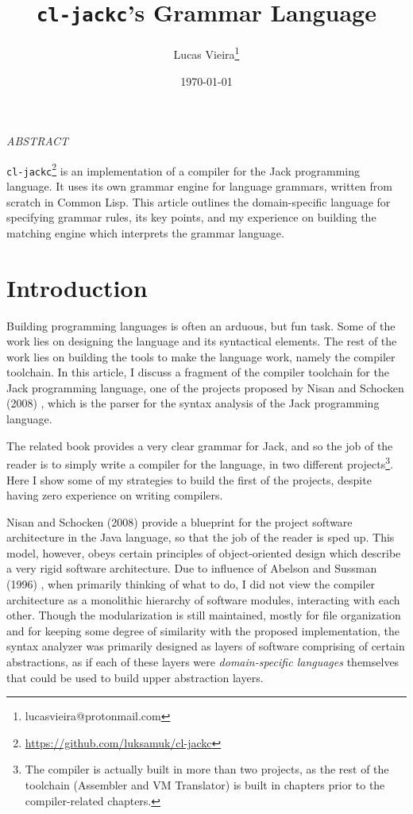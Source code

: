\documentclass[a4paper,11pt,oneside]{article}
\author{Lucas Vieira\thanks{lucasvieira@protonmail.com}}
\date{\today}
\title{\texttt{cl-jackc}'s Grammar Language}
\begin{document}
\maketitle
\begin{center}
\emph{ABSTRACT}
\end{center}

\par\noindent
\texttt{cl-jackc}\footnote{\url{https://github.com/luksamuk/cl-jackc}} is an implementation of a compiler for the Jack
programming language. It uses its own grammar engine for language
grammars, written from scratch in Common Lisp. This article outlines
the domain-specific language for specifying grammar rules, its key
points, and my experience on building the matching engine which
interprets the grammar language.


\section{Introduction}
\label{sec:org8466d2e}

Building programming languages is often an arduous, but fun task. Some
of the work lies on designing the language and its syntactical
elements. The rest of the work lies on building the tools
to make the language work, namely the compiler toolchain. In this
article, I discuss a fragment of the compiler toolchain for the Jack
programming language, one of the projects proposed by Nisan and
Schocken (2008) \cite{nand2tetris}, which is the parser for the syntax
analysis of the Jack programming language.

The related book provides a very clear grammar for Jack, and so the
job of the reader is to simply write a compiler for the language, in
two different projects\footnote{The compiler is actually built in more than two projects, as
the rest of the toolchain (Assembler and VM Translator) is built in
chapters prior to the compiler-related chapters.}. Here I show some of my strategies to
build the first of the projects, despite having zero experience on
writing compilers.

Nisan and Schocken (2008) \cite{nand2tetris} provide a blueprint for the
project software architecture in the Java language, so that the job of
the reader is sped up. This model, however, obeys certain principles
of object-oriented design which describe a very rigid software
architecture. Due to influence of Abelson and Sussman (1996)
\cite{sicp}, when primarily thinking of what to do, I did not view the
compiler architecture as a monolithic hierarchy of software modules,
interacting with each other. Though the modularization is still
maintained, mostly for file organization and for keeping some degree
of similarity with the proposed implementation, the syntax analyzer
was primarily designed as layers of software comprising of certain
abstractions, as if each of these layers were \emph{domain-specific
languages} themselves that could be used to build upper abstraction
layers.
\end{document}
